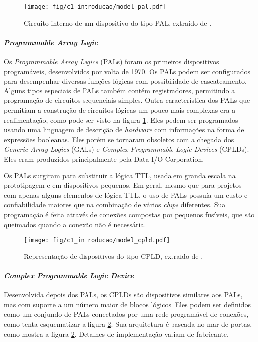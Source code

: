 \documentclass[11pt,a4paper,oneside]{book}
\begin{document}
\begin{figure}[h]
\centering
\texttt{[image: fig/c1\_introducao/model\_pal.pdf]}
\caption{Circuito interno de um dispositivo do tipo PAL, extraido de \cite{Ashenden2008}.}
\label{fig:pal}
\end{figure}

\paragraph{\textit{Programmable Array Logic}}
Os \textit{Programmable Array Logics} (PALs) foram os primeiros dispositivos program\'aveis, desenvolvidos por volta de 1970.
Os PALs podem ser configurados para desempenhar diversas fun\c{c}\~oes l\'ogicas com possibilidade de cascateamento.
Alguns tipos especiais de PALs tamb\'em cont\'em registradores, permitindo a programa\c{c}\~ao de circuitos sequenciais simples.
Outra caracter\'i­stica dos PALs que permitiam a constru\c{c}\~ao de circuitos l\'ogicas um pouco mais complexas era a realimenta\c{c}\~ao, como pode ser visto na figura \ref{fig:pal}.
Eles podem ser programados usando uma linguagem de descri\c{c}\~ao de \textit{hardware} com informa\c{c}\~oes na forma de express\~oes booleanas.
Eles por\'em se tornaram obsoletos com a chegada dos \textit{Generic Array Logics} (GALs) e \textit{Complex Programmable Logic Devices} (CPLDs).
Eles eram produzidos principalmente pela Data I/O Corporation.

Os PALs surgiram para substituir a l\'ogica TTL, usada em granda escala na prototipagem e em dispositivos pequenos.
Em geral, mesmo que para projetos com apenas alguns elementos de l\'ogica TTL, o uso de PALs possu\'i­a um custo e confiabilidade maiores que na combina\c{c}\~ao de v\'arios \textit{chips} diferentes.
Sua programa\c{c}\~ao \'e feita atrav\'es de conex\~oes compostas por pequenos fus\'i­veis, que s\~ao queimados quando a conex\~ao n\~ao \'e necess\'aria.

\begin{figure}[h]
\centering
\texttt{[image: fig/c1\_introducao/model\_cpld.pdf]}
\caption{Representa\c{c}\~ao de dispositivos do tipo CPLD, extraido de \cite{Ashenden2008}.}
\label{fig:cpld}
\end{figure}

\paragraph{\textit{Complex Programmable Logic Device}}
Desenvolvida depois dos PALs, os CPLDs s\~ao dispositivos similares aos PALs, mas com suporte a um n\'umero maior de blocos l\'ogicos.
Eles podem ser definidos como um conjundo de PALs conectados por uma rede program\'avel de conex\~oes, como tenta esquematizar a figura \ref{fig:cpld}.
Sua arquitetura \'e baseada no mar de portas, como mostra a figura \ref{fig:cpld}.
Detalhes de implementa\c{c}\~ao variam de fabricante.
\end{document}
